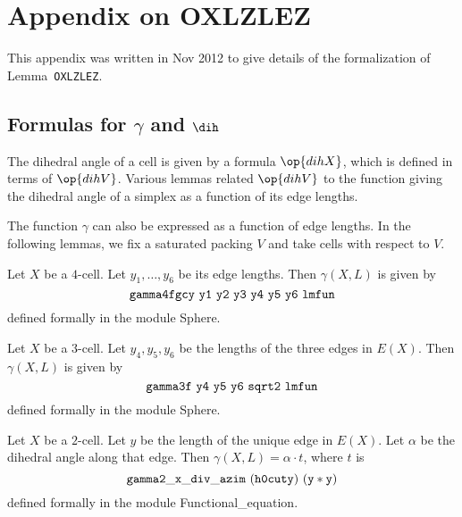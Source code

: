 

\def\bve{{\underline {\hat\u}}}
\def\ke{ k_{\mathbf e}}
\def\pe{{ {\mathbf p}}_{\mathbf e}}
\def\cX{{\mathcal X}}

\newpage
\section{Appendix on OXLZLEZ}\label{sec:oxl}

This appendix was written in Nov 2012 to give details of the formalization of Lemma~{\tt OXLZLEZ}.

\subsection{Formulas for $\gamma$ and $\dih$}

The dihedral angle of a cell is given by a formula $\op{dihX}$, which is defined in terms
of $\op{dihV}$.  Various lemmas related $\op{dihV}$ to the function giving the dihedral
angle of a simplex as a function of its edge lengths.

The function $\gamma$ can also be expressed as a function of edge lengths.
In the following lemmas, we fix a saturated packing $V$ and take cells with respect to $V$.


\begin{lemma} Let $X$ be a $4$-cell.  Let $y_1,\ldots,y_6$ be its edge lengths.  
Then $\gamma(X,L)$  is given by 
\[
{\tt gamma4fgcy~y1~y2~y3~y4~y5~y6~lmfun}
\]
defined formally in the module Sphere.
\end{lemma}

\begin{lemma} Let $X$ be a $3$-cell.  Let $y_4,y_5,y_6$ be the lengths of the three edges
in $E(X)$.  Then $\gamma(X,L)$ is given by
\[
{\tt gamma3f~y4~y5~y6~sqrt2~lmfun}
\]
defined formally in the module Sphere.
\end{lemma}

\begin{lemma} Let $X$ be a $2$-cell.  Let $y$ be the length of the unique edge in $E(X)$.
Let $\alpha$ be the dihedral angle along that edge.
Then $\gamma(X,L)=\alpha\cdot t$, where $t$ is
\[
{\tt
gamma2\_x\_div\_azim~(h0cut y)~(y*y)
}
\]
defined formally in the module Functional\_equation.
\end{lemma}


